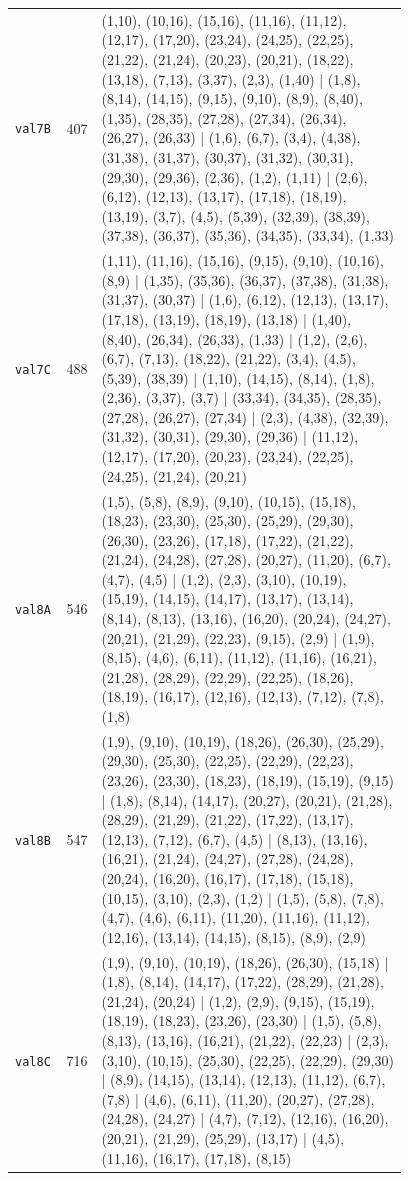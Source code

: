 \begin{landscape}
\begin{longtable}{lr>{\tiny\raggedright\arraybackslash}p{0.78\linewidth}}
\texttt{val7B} & 407 & (1,10), (10,16), (15,16), (11,16), (11,12), (12,17), (17,20), (23,24), (24,25), (22,25), (21,22), (21,24), (20,23), (20,21), (18,22), (13,18), (7,13), (3,37), (2,3), (1,40) | (1,8), (8,14), (14,15), (9,15), (9,10), (8,9), (8,40), (1,35), (28,35), (27,28), (27,34), (26,34), (26,27), (26,33) | (1,6), (6,7), (3,4), (4,38), (31,38), (31,37), (30,37), (31,32), (30,31), (29,30), (29,36), (2,36), (1,2), (1,11) | (2,6), (6,12), (12,13), (13,17), (17,18), (18,19), (13,19), (3,7), (4,5), (5,39), (32,39), (38,39), (37,38), (36,37), (35,36), (34,35), (33,34), (1,33) \\[2pt]
\texttt{val7C} & 488 & (1,11), (11,16), (15,16), (9,15), (9,10), (10,16), (8,9) | (1,35), (35,36), (36,37), (37,38), (31,38), (31,37), (30,37) | (1,6), (6,12), (12,13), (13,17), (17,18), (13,19), (18,19), (13,18) | (1,40), (8,40), (26,34), (26,33), (1,33) | (1,2), (2,6), (6,7), (7,13), (18,22), (21,22), (3,4), (4,5), (5,39), (38,39) | (1,10), (14,15), (8,14), (1,8), (2,36), (3,37), (3,7) | (33,34), (34,35), (28,35), (27,28), (26,27), (27,34) | (2,3), (4,38), (32,39), (31,32), (30,31), (29,30), (29,36) | (11,12), (12,17), (17,20), (20,23), (23,24), (22,25), (24,25), (21,24), (20,21) \\[2pt]
\texttt{val8A} & 546 & (1,5), (5,8), (8,9), (9,10), (10,15), (15,18), (18,23), (23,30), (25,30), (25,29), (29,30), (26,30), (23,26), (17,18), (17,22), (21,22), (21,24), (24,28), (27,28), (20,27), (11,20), (6,7), (4,7), (4,5) | (1,2), (2,3), (3,10), (10,19), (15,19), (14,15), (14,17), (13,17), (13,14), (8,14), (8,13), (13,16), (16,20), (20,24), (24,27), (20,21), (21,29), (22,23), (9,15), (2,9) | (1,9), (8,15), (4,6), (6,11), (11,12), (11,16), (16,21), (21,28), (28,29), (22,29), (22,25), (18,26), (18,19), (16,17), (12,16), (12,13), (7,12), (7,8), (1,8) \\[2pt]
\texttt{val8B} & 547 & (1,9), (9,10), (10,19), (18,26), (26,30), (25,29), (29,30), (25,30), (22,25), (22,29), (22,23), (23,26), (23,30), (18,23), (18,19), (15,19), (9,15) | (1,8), (8,14), (14,17), (20,27), (20,21), (21,28), (28,29), (21,29), (21,22), (17,22), (13,17), (12,13), (7,12), (6,7), (4,5) | (8,13), (13,16), (16,21), (21,24), (24,27), (27,28), (24,28), (20,24), (16,20), (16,17), (17,18), (15,18), (10,15), (3,10), (2,3), (1,2) | (1,5), (5,8), (7,8), (4,7), (4,6), (6,11), (11,20), (11,16), (11,12), (12,16), (13,14), (14,15), (8,15), (8,9), (2,9) \\[2pt]
\texttt{val8C} & 716 & (1,9), (9,10), (10,19), (18,26), (26,30), (15,18) | (1,8), (8,14), (14,17), (17,22), (28,29), (21,28), (21,24), (20,24) | (1,2), (2,9), (9,15), (15,19), (18,19), (18,23), (23,26), (23,30) | (1,5), (5,8), (8,13), (13,16), (16,21), (21,22), (22,23) | (2,3), (3,10), (10,15), (25,30), (22,25), (22,29), (29,30) | (8,9), (14,15), (13,14), (12,13), (11,12), (6,7), (7,8) | (4,6), (6,11), (11,20), (20,27), (27,28), (24,28), (24,27) | (4,7), (7,12), (12,16), (16,20), (20,21), (21,29), (25,29), (13,17) | (4,5), (11,16), (16,17), (17,18), (8,15) \\[2pt]

\end{longtable}
\end{landscape}
